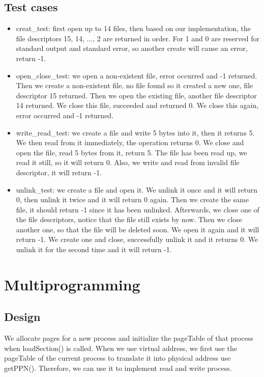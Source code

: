 \documentclass[a4paper,10pt]{article}
\begin{document}
\subsection{Test cases}
\begin{itemize}
\item creat\_test: first open up to 14 files, then based on our implementation, the file descriptors 15, 14, $\dots$, 2 are returned in order. For 1 and 0 are reserved for standard output and standard error, so another create will cause an error, return -1.
\item open\_close\_test: we open a non-existent file, error occurred and -1 returned. Then we create a non-existent file, no file found so it created a new one, file descriptor 15 returned. Then we open the existing file, another file descriptor 14 returned. We close this file, succeeded and returned 0. We close this again, error occurred and -1 returned.
\item write\_read\_test: we create a file and write 5 bytes into it, then it returns 5. We then read from it immediately, the operation returns 0. We close and open the file, read 5 bytes from it, return 5. The file has been read up, we read it still, so it will return 0. Also, we write and read from invalid file descriptor, it will return -1.
\item unlink\_test: we create a file and open it. We unlink it once and it will return 0, then unlink it twice and it will return 0 again. Then we create the same file, it should return -1 since it has been unlinked. Afterwards, we close one of the file descriptors, notice that the file still exists by now. Then we close another one, so that the file will be deleted soon. We open it again and it will return -1. We create one and close, successfully unlink it and it returns 0. We unlink it for the second time and it will return -1.
\end{itemize}

\section{Multiprogramming}

\subsection{Design}

We allocate pages for a new process and initialize the pageTable of that process when loadSection() is called. When we use virtual address, we first use the pageTable of the current process to translate it into physical address use getPPN(). Therefore, we can use it to implement read and write process.
\end{document}

